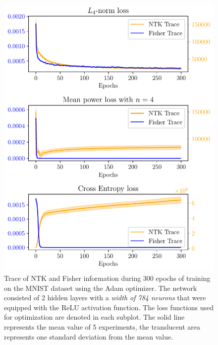 \begin{figure}
	\centering
	\includegraphics{text/results/FisherNTKComparisonPlots/Triple_comparison_losses4_784.pdf}
	\caption{Trace of NTK and Fisher information during 300 epochs of training on the MNIST dataset using the Adam optimizer. The network consisted of 2 hidden layers with a \emph{width of 784 neurons} that were equipped with the ReLU activation function. The loss functions used for optimization are denoted in each subplot. The solid line represents the mean value of 5 experiments, the translucent area represents one standard deviation from the mean value.}
	\label{fig:MNISTTraceComparison4}
\end{figure}
